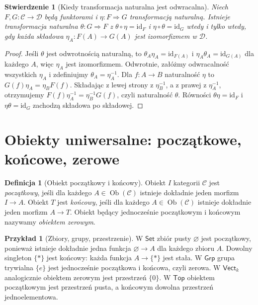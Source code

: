 \documentclass[11pt,a4paper]{article}
\numberwithin{equation}{section}
\theoremstyle{plain}
\newtheorem{stwierdzenie}[twierdzenie]{Stwierdzenie}
\theoremstyle{definition}
\newtheorem{definicja}[twierdzenie]{Definicja}
\newtheorem{przyklad}[twierdzenie]{Przykład}
\theoremstyle{remark}
\newcommand{\cat}[1]{\mathsf{#1}}
\newcommand{\Set}{\cat{Set}}
\newcommand{\Grp}{\cat{Grp}}
\newcommand{\Top}{\cat{Top}}
\newcommand{\Vect}{\cat{Vect}}
\newcommand{\id}{\mathrm{id}}
\newcommand{\Ob}{\operatorname{Ob}}
\begin{document}
\begin{stwierdzenie}[Kiedy transformacja naturalna jest odwracalna]\label{tw:nat-iso-components}
Niech $F,G:\mathcal C\to\mathcal D$ będą funktorami i $\eta:F\Rightarrow G$ transformacją naturalną. Istnieje transformacja naturalna $\theta:G\Rightarrow F$ z $\theta\circ\eta=\id_F$ i $\eta\circ\theta=\id_G$ wtedy i tylko wtedy, gdy każda składowa $\eta_A:F(A)\to G(A)$ jest izomorfizmem w $\mathcal D$.
\end{stwierdzenie}
\begin{proof}
Jeśli $\theta$ jest odwrotnością naturalną, to $\theta_A\eta_A=\id_{F(A)}$ i $\eta_A\theta_A=\id_{G(A)}$ dla każdego $A$, więc $\eta_A$ jest izomorfizmem. Odwrotnie, załóżmy odwracalność wszystkich $\eta_A$ i zdefiniujmy $\theta_A=\eta_A^{-1}$. Dla $f:A\to B$ naturalność $\eta$ to $G(f)\eta_A=\eta_BF(f)$. Składając z lewej strony z $\eta_B^{-1}$, a z prawej z $\eta_A^{-1}$, otrzymujemy $F(f)\eta_A^{-1}=\eta_B^{-1}G(f)$, czyli naturalność $\theta$. Równości $\theta\eta=\id_F$ i $\eta\theta=\id_G$ zachodzą składowa po składowej.
\end{proof}


\section{Obiekty uniwersalne: początkowe, końcowe, zerowe}\label{sec:uniwersalne}

\begin{definicja}[Obiekt początkowy i końcowy]\label{def:poczatkowy}
Obiekt $I$ kategorii $\mathcal C$ jest \emph{początkowy}, jeśli dla każdego $A\in\Ob(\mathcal C)$ istnieje dokładnie jeden morfizm $I\to A$. Obiekt $T$ jest \emph{końcowy}, jeśli dla każdego $A\in\Ob(\mathcal C)$ istnieje dokładnie jeden morfizm $A\to T$. Obiekt będący jednocześnie początkowym i końcowym nazywamy \emph{obiektem zerowym}.
\end{definicja}

\begin{przyklad}[Zbiory, grupy, przestrzenie]
W $\Set$ zbiór pusty $\varnothing$ jest początkowy, ponieważ istnieje dokładnie jedna funkcja $\varnothing\to A$ dla każdego zbioru $A$. Dowolny singleton $\{*\}$ jest końcowy: każda funkcja $A\to\{*\}$ jest stała. W $\Grp$ grupa trywialna $\{e\}$ jest jednocześnie początkowa i końcowa, czyli zerowa. W $\Vect_k$ analogicznie obiektem zerowym jest przestrzeń $\{0\}$. W $\Top$ obiektem początkowym jest przestrzeń pusta, a końcowym dowolna przestrzeń jednoelementowa.
\end{przyklad}
\end{document}
